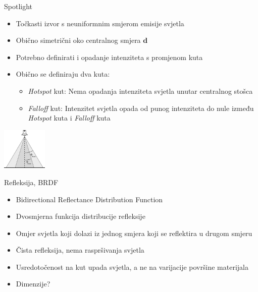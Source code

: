 \documentclass[9pt]{beamer}
\begin{document}
\begin{frame}{Spotlight}
	\begin{itemize} %
		\item Točkasti izvor s \alert{neuniformnim} smjerom emisije svjetla
		\item Obično simetrični oko centralnog smjera $\mathbf{d}$ 
		\item Potrebno definirati i opadanje intenziteta s promjenom kuta
		\item Obično se definiraju dva kuta:
		\begin{itemize}
			\item \textsl{Hotspot} kut: Nema opadanja intenziteta svjetla unutar centralnog stošca
			\item \textsl{Falloff} kut: Intenzitet svjetla opada od punog intenziteta do nule između \textsl{Hotspot} kuta i \textsl{Falloff} kuta
		\end{itemize}
	\end{itemize}
	\begin{center}
		\includegraphics[height=2cm]{slike/spotlight.jpg}
	\end{center}
\end{frame}

\begin{frame}{Refleksija, BRDF}
	\begin{itemize}%
		\item Bidirectional Reflectance Distribution Function
		\item Dvosmjerna funkcija distribucije refleksije
		\item Omjer svjetla koji dolazi iz jednog smjera koji se reflektira u drugom smjeru
		\item Čista refleksija, nema raspršivanja svjetla
		\item Usredotočenost na kut upada svjetla, a ne na varijacije površine materijala
		\item Dimenzije?
	\end{itemize}
\end{frame}
\end{document}
